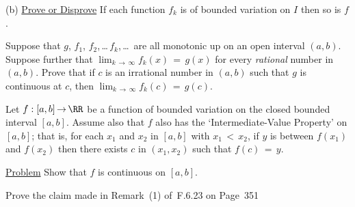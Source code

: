 \V

        (b) \underline{Prove or Disprove} If each function $f_{k}$ is of bounded variation on $I$ then so is $f$.

\V
\V

\noindent \ExFw Suppose that $g$, $f_{1}$, $f_{2}$,\,{\ldots}\,$f_{k}$,\,{\ldots}\, are all monotonic up on an open interval $(a,b)$.
    Suppose further that $\lim_{k \,{\rightarrow}\, {\infty}} f_{k}(x) \,=\, g(x)$ for every {\em rational} number in $(a,b)$.
    Prove that if $c$ is an irrational number in $(a,b)$ such that $g$ is continuous at $c$, then $\lim_{k \,{\rightarrow}\, {\infty}} f_{k}(c) \,=\, g(c)$.

\V
\V

\noindent \ExFx Let $f:[a,b] \,{\rightarrow}\, {\RR}$ be a function of bounded variation on the closed bounded interval $[a,b]$.
    Assume also that $f$ also has the `Intermediate-Value Property' on $[a,b]$; that is, for each $x_{1}$ and $x_{2}$ in $[a,b]$ with $x_{1}\,<\,x_{2}$,
    if $y$ is between $f(x_{1})$ and $f(x_{2})$ then there exists $c$ in $(x_{1},x_{2})$ such that $f(c) \,=\, y$.

        \underline{Problem} Show that $f$ is continuous on $[a,b]$.

\V
\V

\noindent \ExFy Prove the claim made in Remark~(1) of~F.6.23 on Page~351
